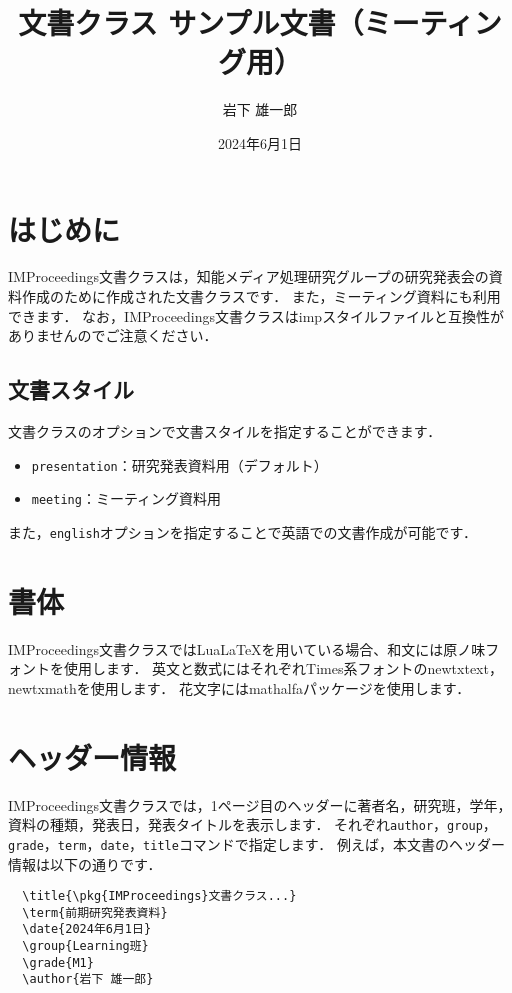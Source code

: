 \documentclass[
  platex,
  dvipdfmx,
  meeting
]{improceedings}
\title{\pkg{IMProceedings}文書クラス サンプル文書（ミーティング用）}
\date{2024年6月1日}
\author{岩下 雄一郎}
\newcommand{\pkg}[1]{\textsf{#1}}
\newcommand{\code}[1]{\texttt{#1}}
\begin{document}
\maketitle

\section{はじめに}

\pkg{IMProceedings}文書クラスは，知能メディア処理研究グループの研究発表会の資料作成のために作成された文書クラスです．
また，ミーティング資料にも利用できます．
なお，\pkg{IMProceedings}文書クラスは\pkg{imp}スタイルファイルと互換性がありませんのでご注意ください．

\subsection{文書スタイル}

文書クラスのオプションで文書スタイルを指定することができます．
\begin{itemize}
  \item \code{presentation}：研究発表資料用（デフォルト）
  \item \code{meeting}：ミーティング資料用
\end{itemize}
また，\code{english}オプションを指定することで英語での文書作成が可能です．

\section{書体}

\pkg{IMProceedings}文書クラスではLuaLaTeXを用いている場合、和文には原ノ味フォントを使用します．
英文と数式にはそれぞれTimes系フォントの\pkg{newtxtext}，\pkg{newtxmath}を使用します．
花文字には\pkg{mathalfa}パッケージを使用します．

\section{ヘッダー情報}

\pkg{IMProceedings}文書クラスでは，1ページ目のヘッダーに著者名，研究班，学年，資料の種類，発表日，発表タイトルを表示します．
それぞれ\code{author}，\code{group}，\code{grade}，\code{term}，\code{date}，\code{title}コマンドで指定します．
例えば，本文書のヘッダー情報は以下の通りです．
\begin{verbatim}
  \title{\pkg{IMProceedings}文書クラス...}
  \term{前期研究発表資料}
  \date{2024年6月1日}
  \group{Learning班}
  \grade{M1}
  \author{岩下 雄一郎}
\end{verbatim}
\end{document}
